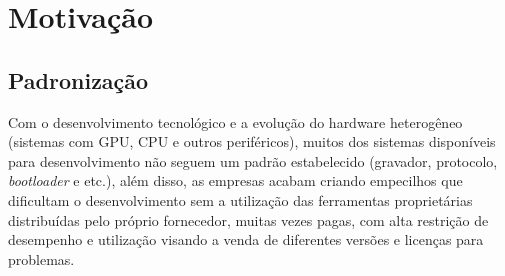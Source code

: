 \section{Motivação}

\subsection{Padronização}
Com o desenvolvimento tecnológico e a evolução do hardware heterogêneo (sistemas com GPU, CPU e outros periféricos), muitos dos sistemas disponíveis para desenvolvimento não seguem um padrão estabelecido (gravador, protocolo, \textit{bootloader} e etc.), além disso, as empresas acabam criando empecilhos que dificultam o desenvolvimento sem a utilização das ferramentas proprietárias distribuídas pelo próprio fornecedor, muitas vezes pagas, com alta restrição de desempenho e utilização visando a venda de diferentes versões e licenças para problemas.

